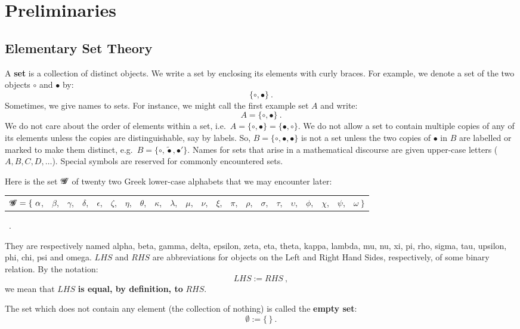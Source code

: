 \chapter{Preliminaries}\label{S:Preliminaries}
\section{Elementary Set Theory}\label{S:SetTheory}
A {\bf set} is a collection of distinct objects.  We write a set by enclosing its elements with curly braces.  For example, we denote a set of the two objects $\circ$ and $\bullet$ by:
\[
\boxed{
\{\circ, \bullet\} 
} \ .
\]
Sometimes, we give names to sets.  For instance, we might call the first example set $A$ and write:
\[
\boxed{
A=\{\circ, \bullet\} }
\ .
\]
We do not care about the order of elements within a set, i.e.~$A=\{\circ, \bullet\}=\{\bullet,\circ\}$.  We do not allow a set to contain multiple copies of any of its elements unless the copies are distinguishable, say by labels.  So, $B=\{\circ, \bullet, \bullet\}$ is not a set unless the two copies of $\bullet$ in $B$ are labelled or marked to make them distinct, e.g.~$B=\{\circ,\tilde{\bullet},\bullet'\}$.  Names for sets that arise in a mathematical discourse are given upper-case letters ($A,B,C,D,\ldots$).  Special symbols are reserved for commonly encountered sets.  

Here is the set ${\mathscr{G}}\mspace{-11 mu}{\mathscr{G}}$ of twenty two Greek lower-case alphabets that we may encounter later:

{\scriptsize
\begin{tabular}{llllllllllllllllllllll}
${\mathscr{G}}\mspace{-11 mu}{\mathscr{G}} = \{\ \alpha$,& $\beta$,& $\gamma$,& $\delta$,& $\epsilon$,& $\zeta$,& $\eta$,& $\theta$,& $\kappa$,& $\lambda$,& $\mu$,& $\nu$,& $\xi$,& $\pi$,& $\rho$,& $\sigma$,& $\tau$,& $\upsilon$,& $\phi$,& $\chi$,& $\psi$,& $\omega \ \} $
\end{tabular} \ .
}

They are respectively named alpha, beta, gamma, delta, epsilon, zeta, eta, theta, kappa, lambda, mu, nu, xi, pi, rho, sigma, tau, upsilon, phi, chi, psi and omega.  $LHS$ and $RHS$ are abbreviations for objects on the Left and Right Hand Sides, respectively, of some binary relation.  By the notation:
\[
\boxed{
LHS := RHS 
} \ ,
\]
we mean that $LHS$ {\bf is equal, by definition, to} $RHS$.  

The set which does not contain any element (the collection of nothing) is called the {\bf empty set}:
\[
\boxed{
\emptyset := \{ \, \} 
} \ .
\]

